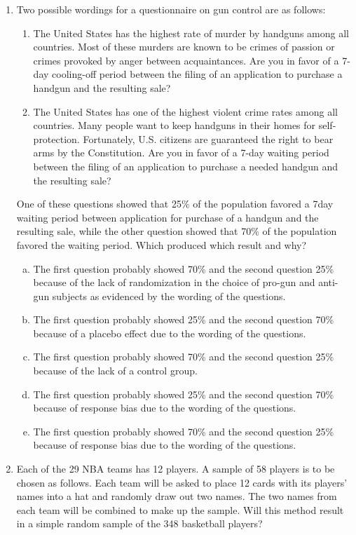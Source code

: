 \documentclass[a4paper,12pt,twoside]{book}
\begin{document}
\begin{enumerate}
   \item Two possible wordings for a questionnaire on gun control are as follows:
       \begin{enumerate}[\Roman*.]
           \item The United States has the highest rate of murder by handguns among all countries. Most of these murders are known to be crimes of passion or crimes provoked by anger between
acquaintances. Are you in favor of a 7-day cooling-off period between the filing of an application to purchase a handgun and the resulting sale?
          \item The United States has one of the highest violent crime rates among all countries. Many people want to keep handguns in their homes for self-protection. Fortunately, U.S. citizens are guaranteed the right to bear arms by the Constitution. Are you in favor of a 7-day waiting period between the filing of an application to purchase a needed handgun and the resulting sale?
       \end{enumerate}     
       One of these questions showed that 25\% of the population favored a 7day waiting period between application for purchase of a handgun and the resulting sale, while the other question showed that 70\% of the population favored the waiting period. Which produced which result and why? 
       \begin{enumerate}[(a)]
           \item The first question probably showed 70\% and the second question 25\% because of the lack of randomization in the choice of pro-gun and anti-gun subjects as evidenced by the wording of the questions.
           \item The first question probably showed 25\% and the second question 70\% because of a placebo effect due to the wording of the questions.
           \item The first question probably showed 70\% and the second question 25\% because of the lack of a control group.
           \item The first question probably showed 25\% and the second question 70\% because of response bias due to the wording of the questions.
           \item The first question probably showed 70\% and the second question 25\% because of response bias due to the wording of the questions.
       \end{enumerate}         
   \item Each of the 29 NBA teams has 12 players. A sample of 58 players is to be chosen as follows. Each team will be asked to place 12 cards with its players’ names into a hat and randomly draw out two names. The two names from each team will be combined to make up the sample. Will this method result in a simple random sample of the 348 basketball players?

\end{enumerate}
\end{document}
